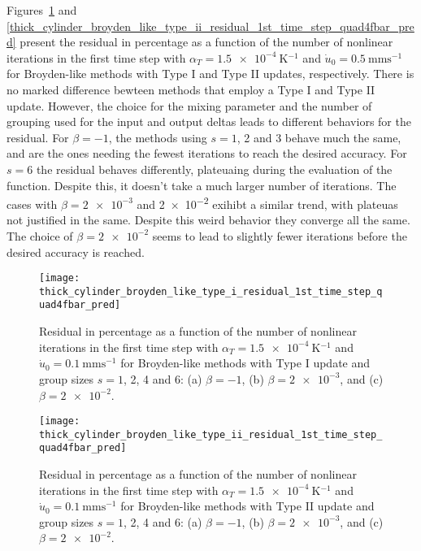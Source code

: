 Figures~\ref{fig:thick_cylinder_broyden_like_type_i_residual_1st_time_step_quad4fbar_pred} and \ref{thick_cylinder_broyden_like_type_ii_residual_1st_time_step_quad4fbar_pred} present the residual in percentage as a function of the number of nonlinear iterations in the first time step with \(\alpha_T=\SI{1.5e-4}{\kelvin^{-1}}\) and \(\dot u_0 =\SI{0.5}{\milli\meter\second^{-1}}\) for Broyden-like methods with Type I and Type II updates, respectively.
There is no marked difference bewteen methods that employ a Type I and Type II update.
However, the choice for the mixing parameter and the number of grouping used for the input and output deltas leads to different behaviors for the residual.
For \(\beta=-1\), the methods using \(s=1\), 2 and 3 behave much the same, and are the ones needing the fewest iterations to reach the desired accuracy.
For \(s=6\) the residual behaves differently, plateuaing during the evaluation of the function.
Despite this, it doesn't take a much larger number of iterations.
The cases with \(\beta=\num{2e-3}\) and \num{2e-2} exihibt a similar trend, with plateuas not justified in the same.
Despite this weird behavior they converge all the same.
The choice of \(\beta=\num{2e-2}\) seems to lead to slightly fewer iterations before the desired accuracy is reached.

\begin{figure}
  \texttt{[image: thick\_cylinder\_broyden\_like\_type\_i\_residual\_1st\_time\_step\_quad4fbar\_pred]}
  \caption{Residual in percentage as a function of the number of nonlinear iterations in the first time step with \(\alpha_T=\SI{1.5e-4}{\kelvin^{-1}}\) and \(\dot u_0 =\SI{0.1}{\milli\meter\second^{-1}}\) for Broyden-like methods with Type I update and group sizes \(s=1\), 2, 4 and 6: (a) \(\beta=-1\), (b) \(\beta=\num{2e-3}\), and (c) \(\beta=\num{2e-2}\).}
\label{fig:thick_cylinder_broyden_like_type_i_residual_1st_time_step_quad4fbar_pred}
\end{figure}

\begin{figure}
  \texttt{[image: thick\_cylinder\_broyden\_like\_type\_ii\_residual\_1st\_time\_step\_quad4fbar\_pred]}
  \caption{Residual in percentage as a function of the number of nonlinear iterations in the first time step with \(\alpha_T=\SI{1.5e-4}{\kelvin^{-1}}\) and \(\dot u_0 =\SI{0.1}{\milli\meter\second^{-1}}\) for Broyden-like methods with Type II update and group sizes \(s=1\), 2, 4 and 6: (a) \(\beta=-1\), (b) \(\beta=\num{2e-3}\), and (c) \(\beta=\num{2e-2}\).}
\label{fig:thick_cylinder_broyden_like_type_ii_residual_1st_time_step_quad4fbar_pred}
\end{figure}

